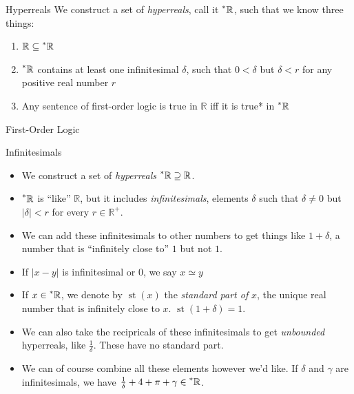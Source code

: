 \documentclass{beamer}
\theoremstyle{plain}
\theoremstyle{definition}
\newcommand{\reals}{\mathbb{R}}
\newcommand{\hreals}{\prescript{*}{}{\mathbb{R}}}
\DeclareMathOperator{\st}{st}
\begin{document}
\begin{frame}{Hyperreals}
We construct a set of \textit{hyperreals}, call it $\hreals$, such that we know three things:
\begin{enumerate}
	\item $\reals \subseteq \hreals$
	\item $\hreals$ contains at least one infinitesimal $\delta$, such that $0 < \delta$ but $\delta < r$ for any positive real number $r$
	\item Any sentence of first-order logic is true in $\reals$ iff it is true* in $\hreals$
\end{enumerate}
\end{frame}

\begin{frame}{First-Order Logic}

\end{frame}



\begin{frame}{Infinitesimals}
\begin{itemize}
	\item We construct a set of \textit{hyperreals} $\hreals \supseteq \reals$.
	\item $\hreals$ is ``like'' $\reals$, but it includes \textit{infinitesimals}, elements $\delta$ such that $\delta \neq 0$ but $|\delta| < r$ for every $r \in \reals^+$.
	\item We can add these infinitesimals to other numbers to get things like $1 + \delta$, a number that is ``infinitely close to'' $1$ but not $1$. 
	\item If $|x - y|$ is infinitesimal or $0$, we say $x \simeq y$
	\item If $x \in \hreals$, we denote by $\st(x)$ the \textit{standard part of} $x$, the unique real number that is infinitely close to $x$. $\st(1 + \delta) = 1$. 
	\item We can also take the recipricals of these infinitesimals to get \textit{unbounded} hyperreals, like $\frac{1}{\delta}$. These have no standard part.
	\item We can of course combine all these elements however we'd like. If $\delta$ and $\gamma$ are infinitesimals, we have $\frac{1}{\delta} + 4 + \pi + \gamma \in \hreals$.
\end{itemize}
\end{frame}
\end{document}
